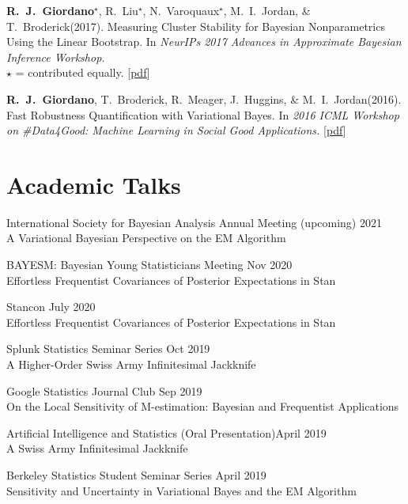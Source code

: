\documentclass[margin,line]{res}
\newcommand{\me}{\textbf{R.~J.~Giordano}\xspace}
\newcommand{\mestar}{\textbf{R.~J.~Giordano}$^{\star}$\xspace}
\newcommand{\tamara}{T.~Broderick\xspace}
\newcommand{\mike}{M.~I.~Jordan\xspace}
\newcommand{\runjingstar}{R.~Liu$^{\star}$\xspace}
\newcommand{\paperref}[1]{[\href{#1}{pdf}]}
\newcommand{\paperref}[1]{}
\begin{document}
\begin{resume}
\mestar, \runjingstar, N.~Varoquaux$^\star$, \mike, \& \tamara (2017).
Measuring Cluster Stability for Bayesian Nonparametrics Using the Linear Bootstrap.
In \emph{NeurIPs 2017 Advances in Approximate Bayesian Inference Workshop.}\\
$\star$ = contributed equally.
\paperref{https://arxiv.org/abs/1712.01435}

\me, \tamara, R.~Meager, J.~Huggins, \& \mike (2016). Fast Robustness
Quantification with Variational Bayes. In \emph{2016 ICML Workshop on
\#Data4Good: Machine Learning in Social Good Applications.}
\paperref{https://arxiv.org/abs/1606.07153}



\pagebreak

\section{\sc Academic Talks}

International Society for Bayesian Analysis Annual Meeting
\hfill(upcoming) 2021\\
A Variational Bayesian Perspective on the EM Algorithm

BAYESM: Bayesian Young Statisticians Meeting \hfill Nov 2020\\
Effortless Frequentist Covariances of Posterior Expectations in Stan

Stancon \hfill July 2020\\
Effortless Frequentist Covariances of Posterior Expectations in Stan

Splunk Statistics Seminar Series \hfill Oct 2019\\
A Higher-Order Swiss Army Infinitesimal Jackknife

Google Statistics Journal Club \hfill Sep 2019\\
On the Local Sensitivity of M-estimation: Bayesian and Frequentist Applications

Artificial Intelligence and Statistics (Oral Presentation)\hfill April 2019\\
A Swiss Army Infinitesimal Jackknife

Berkeley Statistics Student Seminar Series \hfill April 2019\\
Sensitivity and Uncertainty in Variational Bayes and the EM Algorithm


\end{resume}
\end{document}
